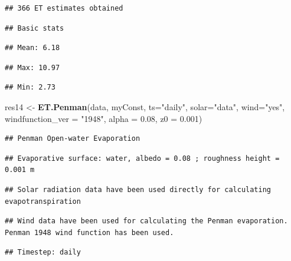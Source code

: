 \documentclass[
]{book}
\newenvironment{Shaded}{\begin{snugshade}}{\end{snugshade}}
\newcommand{\DataTypeTok}[1]{\textcolor[rgb]{0.13,0.29,0.53}{#1}}
\newcommand{\FloatTok}[1]{\textcolor[rgb]{0.00,0.00,0.81}{#1}}
\newcommand{\KeywordTok}[1]{\textcolor[rgb]{0.13,0.29,0.53}{\textbf{#1}}}
\newcommand{\NormalTok}[1]{#1}
\newcommand{\StringTok}[1]{\textcolor[rgb]{0.31,0.60,0.02}{#1}}
\begin{document}
\begin{verbatim}
## 366 ET estimates obtained
\end{verbatim}

\begin{verbatim}
## Basic stats
\end{verbatim}

\begin{verbatim}
## Mean: 6.18
\end{verbatim}

\begin{verbatim}
## Max: 10.97
\end{verbatim}

\begin{verbatim}
## Min: 2.73
\end{verbatim}

\begin{Shaded}
\begin{Highlighting}[]
\NormalTok{res14 <-}\StringTok{ }\KeywordTok{ET.Penman}\NormalTok{(data, myConst, }\DataTypeTok{ts=}\StringTok{"daily"}\NormalTok{, }
                   \DataTypeTok{solar=}\StringTok{"data"}\NormalTok{, }\DataTypeTok{wind=}\StringTok{"yes"}\NormalTok{, }
                   \DataTypeTok{windfunction_ver =} \StringTok{"1948"}\NormalTok{, }\DataTypeTok{alpha =} \FloatTok{0.08}\NormalTok{, }\DataTypeTok{z0 =} \FloatTok{0.001}\NormalTok{)}
\end{Highlighting}
\end{Shaded}

\begin{verbatim}
## Penman Open-water Evaporation
\end{verbatim}

\begin{verbatim}
## Evaporative surface: water, albedo = 0.08 ; roughness height = 0.001 m
\end{verbatim}

\begin{verbatim}
## Solar radiation data have been used directly for calculating evapotranspiration
\end{verbatim}

\begin{verbatim}
## Wind data have been used for calculating the Penman evaporation. Penman 1948 wind function has been used.
\end{verbatim}

\begin{verbatim}
## Timestep: daily
\end{verbatim}
\end{document}
